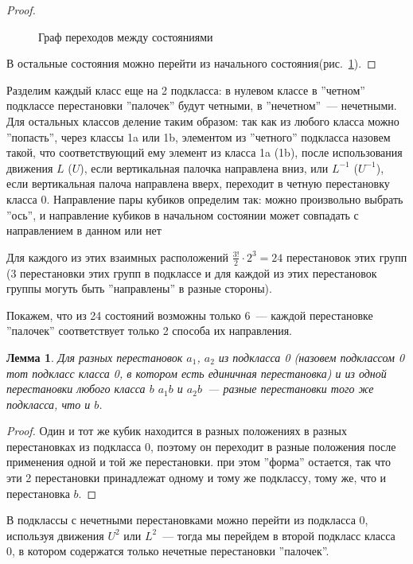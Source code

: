 \documentclass[utf8,a4paper,draft]{article}
\newtheorem{lemma_cub}{Лемма}
\begin{document}
\begin{proof}
\begin{figure}[h]
\caption{Граф переходов между состояниями\label{states_graph}}
\end{figure}
В остальные состояния можно перейти из начального состояния(рис.~\ref{states_graph}).
\end{proof}
Разделим каждый класс еще на 2 подкласса: в нулевом классе в ''четном'' подклассе перестановки ''палочек''  будут четными, в ''нечетном''~--- нечетными. Для остальных классов деление таким образом: так как из любого класса можно ''попасть'', через классы 1a или 1b, элементом из ''четного'' подкласса назовем такой, что соответствующий ему элемент из класса 1a (1b), после использования движения $L$ ($U$), если вертикальная палочка направлена вниз, или $L^{-1}$ ($U^{-1}$), если вертикальная палоча направлена вверх, переходит в четную перестановку класса 0. Направление пары кубиков определим так: можно произвольно выбрать ''ось'', и направление кубиков в начальном состоянии может совпадать с направлением в данном или нет

Для каждого из этих взаимных расположений $\frac{3!}{2}\cdot 2^3=24$ перестановок этих групп (3 перестановки этих групп в подклассе и для каждой из этих перестановок группы могуть быть ''направлены'' в разные стороны).

Покажем, что из 24 состояний возможны только 6~--- каждой перестановке ''палочек'' соответствует только 2 способа их направления.
\begin{lemma_cub}
Для разных перестановок $a_1$, $a_2$ из подкласса 0 (назовем подклассом 0 тот подкласс класса 0, в котором есть единичная перестановка) и из одной перестановки любого класса $b$ $a_1b$ и $a_2b$~--- разные перестановки того же подкласса, что и $b$.\label{lemma_classes}
\end{lemma_cub}
\begin{proof}
Один и тот же кубик находится в разных положениях в разных перестановках из подкласса 0, поэтому он переходит в разные положения после применения одной и той же перестановки. при этом ''форма'' остается, так что эти 2 перестановки принадлежат одному и тому же подклассу, тому же, что и перестановка $b$.
\end{proof}
В подклассы с нечетными перестановками можно перейти из подкласса 0, используя движения $U^2$ или $L^2$~--- тогда мы перейдем в второй подкласс класса 0, в котором содержатся только нечетные перестановки ''палочек''.
\end{document}
